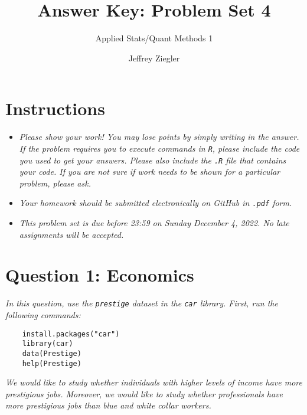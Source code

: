 \documentclass[12pt,letterpaper]{article}
\title{Answer Key: Problem Set 4}
\date{Jeffrey Ziegler}
\author{Applied Stats/Quant Methods 1}
\begin{document}
	\maketitle
	
	\section*{Instructions}
	\begin{itemize}
		\item \textit{Please show your work! You may lose points by simply writing in the answer. If the problem requires you to execute commands in \texttt{R}, please include the code you used to get your answers. Please also include the \texttt{.R} file that contains your code. If you are not sure if work needs to be shown for a particular problem, please ask.}
	\item \textit{Your homework should be submitted electronically on GitHub in \texttt{.pdf} form.}
	\item \textit{This problem set is due before 23:59 on Sunday December 4, 2022. No late assignments will be accepted.}
	\end{itemize}
		\vspace{.5cm}
	\section*{Question 1: Economics}
	\vspace{.25cm}
	\noindent 	\textit{In this question, use the \texttt{prestige} dataset in the \texttt{car} library. First, run the following commands:}
	
	\begin{verbatim}
	install.packages("car")
	library(car)
	data(Prestige)
	help(Prestige)
	\end{verbatim} 
	
	
	\noindent \textit{We would like to study whether individuals with higher levels of income have more prestigious jobs. Moreover, we would like to study whether professionals have more prestigious jobs than blue and white collar workers.}
	
\end{document}
